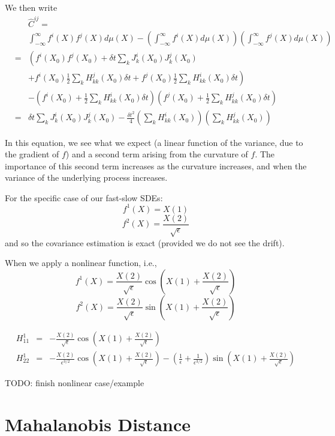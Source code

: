 \documentclass[12pt]{article}
\begin{document}
We then write
\begin{eqnarray}
&& \hat{C}^{ij} = \\ 
&& \int_{-\infty}^{\infty} f^i(X) f^j(X) d\mu(X) - \left(\int_{-\infty}^{\infty} f^i(X) d\mu(X) \right) \left(\int_{-\infty}^{\infty} f^j(X) d\mu(X) \right) \\
&=& \left( f^i(X_0) f^j(X_0) + \delta t \sum_k J_k^i(X_0) J_k^j(X_0) \right. \\
&& \left. + f^i(X_0) \frac{1}{2} \sum_k H^j_{kk}(X_0) \delta t + f^j(X_0)\frac{1}{2} \sum_k H^i_{kk}(X_0) \delta t \right) \\
&& - \left(f^i(X_0) + \frac{1}{2} \sum_k H^i_{kk}(X_0) \delta t \right)
\left(f^j(X_0) + \frac{1}{2} \sum_k H^j_{kk}(X_0) \delta t \right) \\
&=& \delta t \sum_k J_k^i(X_0) J_k^j(X_0) - \frac{\delta t^2}{4} \left( \sum_k H^i_{kk}(X_0) \right) \left( \sum_k H^j_{kk}(X_0) \right)
\end{eqnarray}


In this equation, we see what we expect (a linear function of the variance, due to the gradient of $f$) and a second term arising from the curvature of $f$.
%
The importance of this second term increases as the curvature increases, and when the variance of the underlying process increases. 


For the specific case of our fast-slow SDEs:
$$f^1(X) = X(1)$$
$$f^2(X) = \frac{X(2)}{\sqrt{\epsilon}}$$
and so the covariance estimation is exact (provided we do not see the drift).

When we apply a nonlinear function, i.e., 
$$f^1(X) = \frac{X(2)}{\sqrt{\epsilon}} \cos \left(X(1)+\frac{X(2)}{\sqrt{\epsilon}} \right)$$
$$f^2(X) = \frac{X(2)}{\sqrt{\epsilon}} \sin \left(X(1)+\frac{X(2)}{\sqrt{\epsilon}} \right)$$

\begin{eqnarray}
H_{11}^1 &=& 
-\frac{X(2)}{\sqrt{\epsilon}} \cos \left(X(1)+\frac{X(2)}{\sqrt{\epsilon}} \right) \\
H_{22}^1 &=&
-\frac{X(2)}{\epsilon^{3/2}} \cos \left(X(1)+\frac{X(2)}{\sqrt{\epsilon}} \right) - \left( \frac{1}{\epsilon} + \frac{1}{\epsilon^{3/2}} \right) \sin \left(X(1)+\frac{X(2)}{\sqrt{\epsilon}} \right) 
\end{eqnarray}

TODO: finish nonlinear case/example


\section{Mahalanobis Distance}
\end{document}

